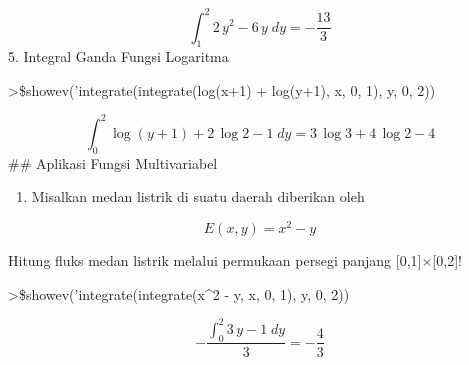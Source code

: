 \documentclass[
]{book}
\providecommand{\tightlist}{%
  \setlength{\itemsep}{0pt}\setlength{\parskip}{0pt}}
\begin{document}
\[\int_{1}^{2}{2\,y^2-6\,y\;dy}=-\frac{13}{3}\]5. Integral Ganda Fungsi Logaritma

\textgreater\$showev('integrate(integrate(log(x+1) + log(y+1), x, 0, 1), y, 0, 2))

\[\int_{0}^{2}{\log \left(y+1\right)+2\,\log 2-1\;dy}=3\,\log 3+4\,  \log 2-4\]\#\# Aplikasi Fungsi Multivariabel

\begin{enumerate}
\def\labelenumi{\arabic{enumi}.}
\tightlist
\item
  Misalkan medan listrik di suatu daerah diberikan oleh
\end{enumerate}

\[E(x,y)=x^2 - y\]

Hitung fluks medan listrik melalui permukaan persegi panjang {[}0,1{]}×{[}0,2{]}!

\textgreater\$showev('integrate(integrate(x\^{}2 - y, x, 0, 1), y, 0, 2))

\[-\frac{\int_{0}^{2}{3\,y-1\;dy}}{3}=-\frac{4}{3}\]

\backmatter
\end{document}
